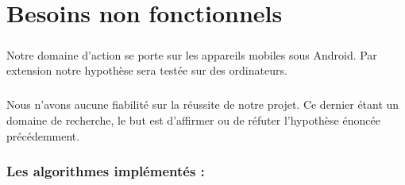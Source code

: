 \chapter{Besoins non fonctionnels}

\paragraph{}
	Notre domaine d'action se porte sur les appareils mobiles sous Android. Par extension notre hypothèse sera testée sur des ordinateurs.
\paragraph{}
	Nous n'avons aucune fiabilité sur la réussite de notre projet. Ce dernier étant un domaine de recherche, le but est d'affirmer ou de réfuter l'hypothèse énoncée précédemment.

\subsection*{Les algorithmes implémentés :\\}


